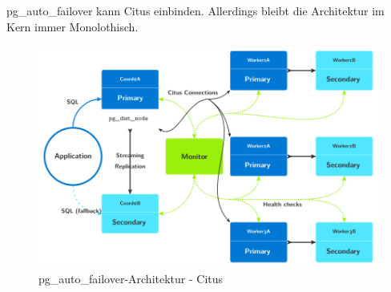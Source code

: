 \begin{flushleft}
    pg\_auto\_failover kann Citus einbinden\cite{3FVHLIFE}.
    Allerdings bleibt die Architektur im Kern immer Monolothisch.
    \begin{figure}[H]
        \centering
        \includegraphics[width=0.75\linewidth]{source/implementation/evaluation/postgresql_ha_solutions/pg_auto_failover/pg_auto-failover_arch-citus}
        \caption{pg\_auto\_failover-Architektur - Citus}
        \label{fig:pg_auto-failover_arch-citus}
    \end{figure}
\end{flushleft}